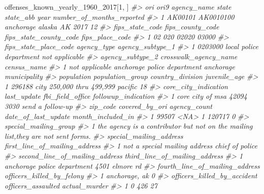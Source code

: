 \documentclass[
  12pt,
]{book}
\newenvironment{Shaded}{\begin{snugshade}}{\end{snugshade}}
\newcommand{\CommentTok}[1]{\textcolor[rgb]{0.37,0.37,0.37}{\textit{#1}}}
\newcommand{\DecValTok}[1]{\textcolor[rgb]{0.06,0.06,0.06}{#1}}
\newcommand{\NormalTok}[1]{#1}
\begin{document}
\begin{Shaded}
\begin{Highlighting}[]
\NormalTok{offenses\_known\_yearly\_1960\_2017[}\DecValTok{1}\NormalTok{, ]}
\CommentTok{\#\textgreater{}       ori      ori9 agency\_name  state state\_abb year number\_of\_months\_reported}
\CommentTok{\#\textgreater{} 1 AK00101 AK0010100   anchorage alaska        AK 2017                        12}
\CommentTok{\#\textgreater{}   fips\_state\_code fips\_county\_code fips\_state\_county\_code fips\_place\_code}
\CommentTok{\#\textgreater{} 1              02              020                  02020           03000}
\CommentTok{\#\textgreater{}   fips\_state\_place\_code             agency\_type agency\_subtype\_1}
\CommentTok{\#\textgreater{} 1               0203000 local police department   not applicable}
\CommentTok{\#\textgreater{}   agency\_subtype\_2       crosswalk\_agency\_name            census\_name}
\CommentTok{\#\textgreater{} 1   not applicable anchorage police department anchorage municipality}
\CommentTok{\#\textgreater{}   population          population\_group country\_division juvenile\_age}
\CommentTok{\#\textgreater{} 1     296188 city 250,000 thru 499,999          pacific           18}
\CommentTok{\#\textgreater{}   core\_city\_indication last\_update fbi\_field\_office followup\_indication}
\CommentTok{\#\textgreater{} 1     core city of msa       42094             3030    send a follow{-}up}
\CommentTok{\#\textgreater{}   zip\_code covered\_by\_ori agency\_count date\_of\_last\_update month\_included\_in}
\CommentTok{\#\textgreater{} 1    99507           \textless{}NA\textgreater{}            1              120717                 0}
\CommentTok{\#\textgreater{}                                                              special\_mailing\_group}
\CommentTok{\#\textgreater{} 1 the agency is a contributor but not on the mailing list,they are not sent forms.}
\CommentTok{\#\textgreater{}         special\_mailing\_address first\_line\_of\_mailing\_address}
\CommentTok{\#\textgreater{} 1 not a special mailing address               chief of police}
\CommentTok{\#\textgreater{}   second\_line\_of\_mailing\_address third\_line\_of\_mailing\_address}
\CommentTok{\#\textgreater{} 1    anchorage police department                4501 elmore rd}
\CommentTok{\#\textgreater{}   fourth\_line\_of\_mailing\_address officers\_killed\_by\_felony}
\CommentTok{\#\textgreater{} 1                  anchorage, ak                         0}
\CommentTok{\#\textgreater{}   officers\_killed\_by\_accident officers\_assaulted actual\_murder}
\CommentTok{\#\textgreater{} 1                           0                426            27}

\end{Highlighting}
\end{Shaded}
\end{document}
